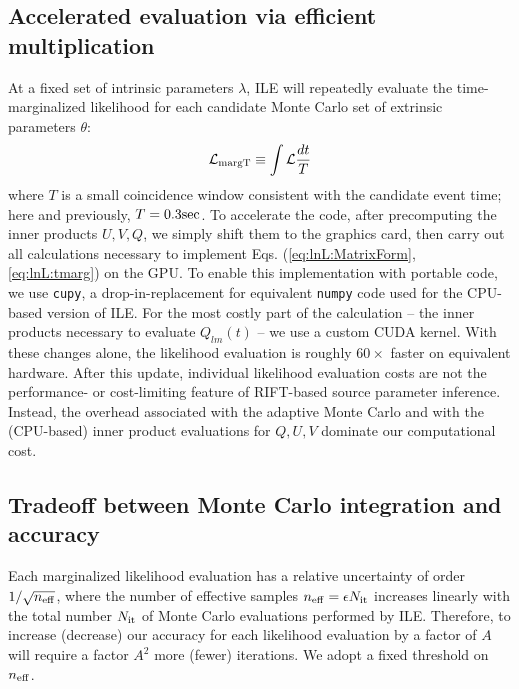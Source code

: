 \documentclass[twocolumn,prd,nofootinbib]{revtex4}
\newcommand\unit[1]{{\rm #1}}
\newcommand\ILE{ILE}
\begin{document}
\subsection{Accelerated evaluation via efficient multiplication}


At a fixed set of intrinsic parameters $\lambda$, \ILE{} will repeatedly evaluate the time-marginalized likelihood 
for each candidate Monte Carlo set of extrinsic parameters $\theta$:
\begin{eqnarray}
{\cal L}_{\rm margT} \equiv  \int {\cal L} \frac{dt}{T}
\label{eq:lnL:tmarg}
\end{eqnarray}
where $T$ is a small coincidence window consistent with the candidate event time; here and previously,
$T=0.3\unit{sec}$.   To accelerate the code, after precomputing the inner products $U,V,Q$, we simply shift them to the
graphics card, then carry out all calculations necessary to implement Eqs. (\ref{eq:lnL:MatrixForm}, \ref{eq:lnL:tmarg})
on the GPU.  To enable this implementation with portable code, we use \texttt{cupy}, a drop-in-replacement for equivalent
\texttt{numpy} code used for the CPU-based version of ILE.    For the most costly part of the calculation -- the inner
products necessary to evaluate $Q_{lm}(t)$ -- we use a custom CUDA kernel.  
%
With these changes alone, the likelihood evaluation is roughly $60\times$ faster on equivalent hardware.  
After this update, individual likelihood evaluation costs are not the performance- or cost-limiting feature of RIFT-based source
parameter inference.  Instead, the overhead associated with the adaptive Monte Carlo and with the (CPU-based) inner
product evaluations for $Q,U,V$ dominate our computational cost.



\subsection{Tradeoff between Monte Carlo integration and accuracy}

Each marginalized likelihood evaluation has a relative uncertainty of order  $1/\sqrt{n_{\rm eff}}$, where the number of
effective samples $n_{\rm eff}=\epsilon N_{\rm it}$ increases linearly with the total number $N_{\rm it}$ of Monte Carlo
evaluations performed by \ILE{}.  Therefore, to increase (decrease) our accuracy for each likelihood evaluation by a factor of $A$
will require a factor $A^2$ more (fewer) iterations.   
%
We adopt a fixed threshold on $n_{\rm eff}$.  
\end{document}

